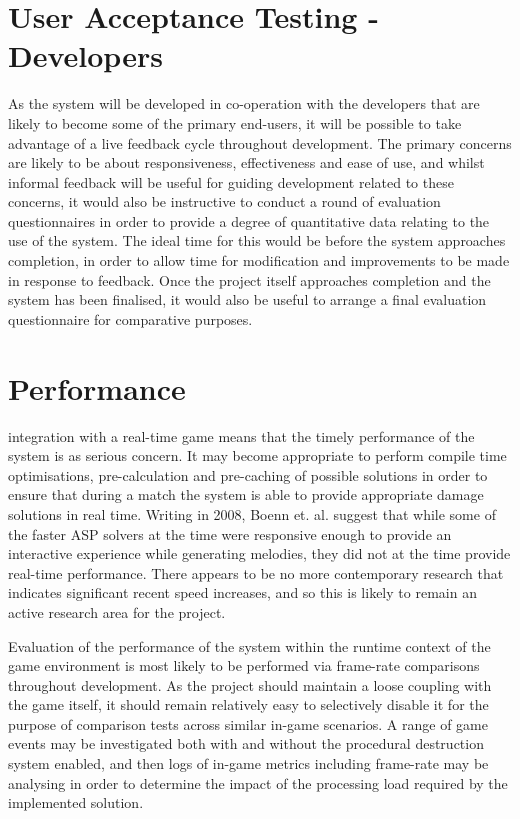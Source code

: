 \documentclass[11pt]{report}
\begin{document}
	\section{User Acceptance Testing - Developers}
		As the system will be developed in co-operation with the developers that are likely to become some of the primary end-users, it will be possible to take advantage of a live feedback cycle throughout development. The primary concerns are likely to be about responsiveness, effectiveness and ease of use, and whilst informal feedback will be useful for guiding development related to these concerns, it would also be instructive to conduct a round of evaluation questionnaires in order to provide a degree of quantitative data relating to the use of the system. The ideal time for this would be before the system approaches completion, in order to allow time for modification and improvements to be made in response to feedback. Once the project itself approaches completion and the system has been finalised, it would also be useful to arrange a final evaluation questionnaire for comparative purposes.

	\section{Performance}
		integration with a real-time game means that the timely performance of the system is as serious concern. It may become appropriate to perform compile time optimisations, pre-calculation and pre-caching of possible solutions in order to ensure that during a match the system is able to provide appropriate damage solutions in real time. 
		Writing in 2008, Boenn et. al. \cite{boenn2008automatic} suggest that while some of the faster ASP solvers at the time were responsive enough to provide an interactive experience while generating melodies, they did not at the time provide real-time performance. There appears to be no more contemporary research that indicates significant recent speed increases, and so this is likely to remain an active research area for the project.

		Evaluation of the performance of the system within the runtime context of the game environment is most likely to be performed via frame-rate comparisons throughout development. As the project should maintain a loose coupling with the game itself, it should remain relatively easy to selectively disable it for the purpose of comparison tests across similar in-game scenarios. A range of game events may be investigated both with and without the procedural destruction system enabled, and then logs of in-game metrics including frame-rate may be analysing in order to determine the impact of the processing load required by the implemented solution.
\end{document}
